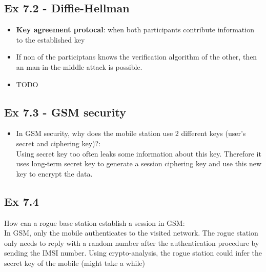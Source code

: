 \subsection*{Ex 7.2 - Diffie-Hellman}
\begin{itemize}
	\item \textbf{Key agreement protocal}: when both participants contribute information to the established key
	\item If non of the participtans knows the verification algorithm of the other, then an man-in-the-middle attack is possible.
	\item TODO
\end{itemize}

\subsection*{Ex 7.3 - GSM security}
\begin{itemize}
	\item In GSM security, why does the mobile station use 2 different keys (user's secret and ciphering key)?:\\
Using secret key too often leaks some information about this key. Therefore it uses long-term secret key to generate a session ciphering key and use this new key to encrypt the data.

\end{itemize}

\subsection*{Ex 7.4}
How can a rogue base station establish a session in GSM: \\
In GSM, only the mobile authenticates to the visited network. The rogue station only needs to reply with a random number after the authentication procedure by sending the IMSI number. Using crypto-analysis, the rogue station could infer the secret key of the mobile (might take a while)



